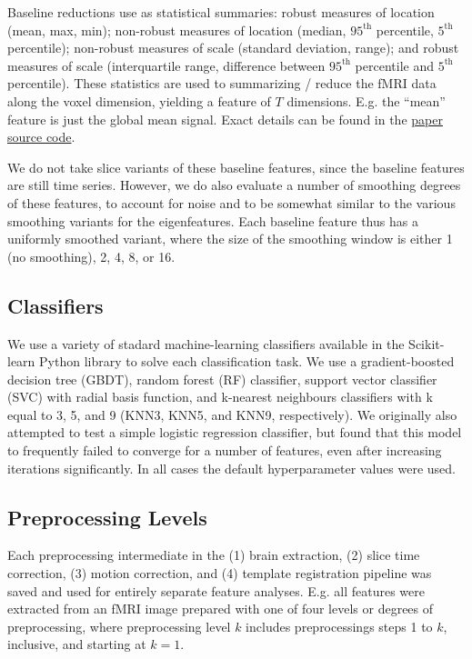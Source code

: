\documentclass[12pt]{spieman}  %
\begin{document}
\begin{spacing}{2}
Baseline reductions use as statistical summaries: robust measures of location
(mean, max, min); non-robust measures of location (median, \(95^{\text{th}}\)
percentile, \(5^{\text{th}}\) percentile); non-robust measures of scale
(standard deviation, range); and robust measures of scale (interquartile range,
difference between \(95^{\text{th}}\) percentile and \(5^{\text{th}}\)
percentile). These statistics are used to summarizing / reduce the fMRI data
along the voxel dimension, yielding a feature of \(T\) dimensions. E.g. the ``mean''
feature is just the global mean signal. Exact details can be found in the
\href{https://github.com/DM-Berger/random-matrix-fmri/blob/master/code/rmt/enumerables.py#L51-L69}{paper
source code}.

We do not take slice variants of these baseline features, since the baseline
features are still time series. However, we do also evaluate a number of
smoothing degrees of these features, to account for noise and to be somewhat
similar to the various smoothing variants for the eigenfeatures. Each baseline
feature thus has a uniformly smoothed variant, where the size of the smoothing
window is either 1 (no smoothing), 2, 4, 8, or 16.


\subsection{Classifiers}

We use a variety of stadard machine-learning classifiers available in the
Scikit-learn\cite{pedregosaScikitlearnMachineLearning2011} Python library to
solve each classification task. We use a gradient-boosted decision tree (GBDT),
random forest (RF) classifier, support vector classifier (SVC) with radial
basis function, and k-nearest neighbours classifiers with k equal to 3, 5, and
9 (KNN3, KNN5, and KNN9, respectively). We originally also attempted to test a
simple logistic regression classifier, but found that this model to frequently
failed to converge for a number of features, even after increasing iterations
significantly. In all cases the default hyperparameter values were used.

\subsection{Preprocessing Levels}

Each preprocessing intermediate in the (1) brain extraction, (2) slice time
correction, (3) motion correction, and (4) template registration pipeline was
saved and used for entirely separate feature analyses. E.g. all features were
extracted from an fMRI image prepared with one of four levels or degrees of
preprocessing, where preprocessing level \(k\) includes preprocessings steps 1 to \(k\),
inclusive, and starting at \(k = 1\).


\end{spacing}
\end{document}
